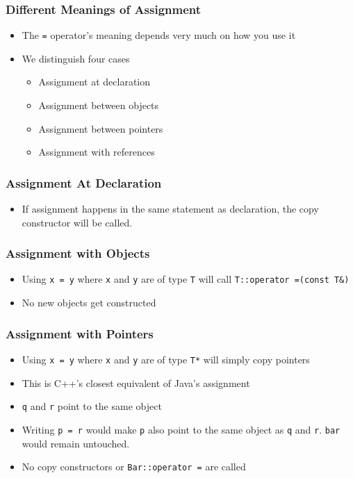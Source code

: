 \begin{frame}
  \frametitle{Different Meanings of Assignment}
  \begin{itemize}
    \item The {\tt =} operator's meaning depends very much on how you use it
    \item We distinguish four cases
          \begin{itemize}
            \item Assignment at declaration
            \item Assignment between objects
            \item Assignment between pointers
            \item Assignment with references
          \end{itemize}
  \end{itemize}
\end{frame}

\begin{frame}
  \frametitle{Assignment At Declaration}
  \begin{itemize}
    \item If assignment happens in the same statement as declaration,
          the copy constructor will be called.
  \end{itemize}
\end{frame}

\begin{frame}
  \frametitle{Assignment with Objects}
  \begin{itemize}
    \item Using {\tt x = y} where {\tt x} and {\tt y} are of type {\tt T}
          will call {\tt T::operator =(const T\&)}
    \item No new objects get constructed
  \end{itemize}
\end{frame}

\begin{frame}
  \frametitle{Assignment with Pointers}
  \begin{itemize}
    \item Using {\tt x = y} where {\tt x} and {\tt y} are of type {\tt T*}
          will simply copy pointers
    \item This is C++'s closest equivalent of Java's assignment
    \item {\tt q} and {\tt r} point to the same object
    \item Writing {\tt p = r} would make {\tt p} also point to the same object as {\tt q} and {\tt r}.
          {\tt bar} would remain untouched.
    \item No copy constructors or {\tt Bar::operator =} are called
  \end{itemize}
\end{frame}

